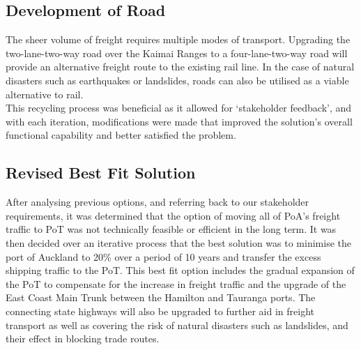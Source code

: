 \subsection*{Development of Road}
The sheer volume of freight requires multiple modes of transport. Upgrading the two-lane-two-way road over the Kaimai Ranges to a four-lane-two-way road will provide an alternative freight route to the existing rail line. In the case of natural disasters such as earthquakes or landslides, roads can also be utilised as a viable alternative to rail.
\\\newline This recycling process was beneficial as it allowed for ‘stakeholder feedback’, and with each iteration, modifications were made that improved the solution’s overall functional capability and better satisfied the problem.



\subsection*{Revised Best Fit Solution}

After analysing previous options, and referring back to our stakeholder requirements, it was determined that the option of moving all of PoA’s freight traffic to PoT was not technically feasible or efficient in the long term. It was then decided over an iterative process that the best solution was to minimise the port of Auckland to 20\% over a period of 10 years and transfer the excess shipping traffic to the PoT. This best fit option includes the gradual expansion of the PoT to compensate for the increase in freight traffic and the upgrade of the East Coast Main Trunk between the Hamilton and Tauranga ports. The connecting state highways will also be upgraded to further aid in freight transport as well as covering the risk of natural disasters such as landslides, and their effect in blocking trade routes.

